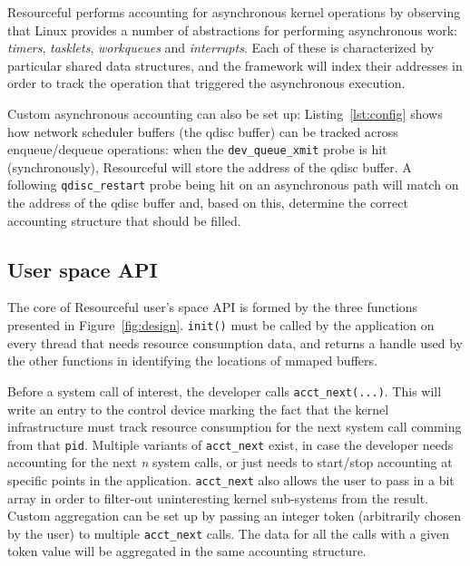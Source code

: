 \documentclass[letterpaper,twocolumn,10pt]{article}
\newcommand{\pname}{Resourceful}
\begin{document}
\pname{ }performs accounting for asynchronous kernel operations by observing
that Linux provides a number of abstractions for performing asynchronous work:
\emph{timers}, \emph{tasklets}, \emph{workqueues} and \emph{interrupts}. Each of
these is characterized by particular shared data structures, and the framework
will index their addresses in order to track the operation that triggered the
asynchronous execution.

Custom asynchronous accounting can also be set up: Listing~\ref{lst:config}
shows how network scheduler buffers (the qdisc buffer) can be tracked across
enqueue/dequeue operations: when the \texttt{dev\_queue\_xmit} probe is hit
(synchronously), \pname{ }will store the address of the qdisc buffer. A
following \texttt{qdisc\_restart} probe being hit on an asynchronous path will
match on the address of the qdisc buffer and, based on this, determine the
correct accounting structure that should be filled.


\subsection{User space API}
The core of \pname{ }user's space API is formed by the three functions presented
in Figure~\ref{fig:design}. \texttt{init()} must be called by the application on
every thread that needs resource consumption data, and returns a handle used by
the other functions in identifying the locations of mmaped buffers. 

Before a system call of interest, the developer calls
\texttt{acct\_next(...)}. This will write an entry to the control device marking
the fact that the kernel infrastructure must track resource consumption for the
next system call comming from that \texttt{pid}. Multiple variants of
\texttt{acct\_next} exist, in case the developer needs accounting for the next
\textit{n} system calls, or just needs to start/stop accounting at specific
points in the application. \texttt{acct\_next} also allows the user to pass in a
bit array in order to filter-out uninteresting kernel sub-systems from the
result. Custom aggregation can be set up by passing an integer token
(arbitrarily chosen by the user) to multiple \texttt{acct\_next} calls. The data
for all the calls with a given token value will be aggregated in the same
accounting structure.
\end{document}
